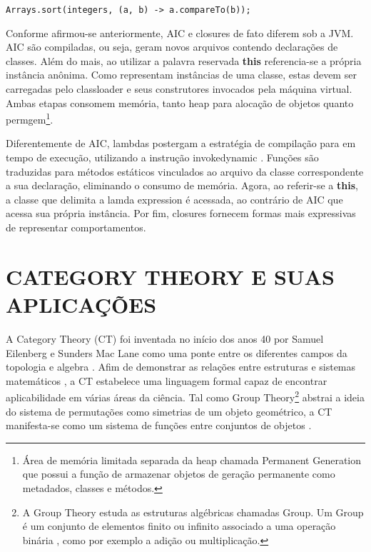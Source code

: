 \documentclass[10pt, conference]{IEEEtran}
\begin{document}
\begin{lstlisting}[caption={Sort - Lambda Expressions}, label={lst:array-lambda-sort}]
Arrays.sort(integers, (a, b) -> a.compareTo(b));
\end{lstlisting}

Conforme afirmou-se anteriormente, AIC e closures de fato diferem sob a JVM. AIC são compiladas, ou seja, geram novos arquivos contendo declarações de classes. Além do mais, ao utilizar a palavra reservada \textbf{this} referencia-se a própria instância anônima. Como representam instâncias de uma classe, estas devem ser carregadas pelo classloader e seus construtores invocados pela máquina virtual. Ambas etapas consomem memória, tanto heap \cite{hunt2011java} para alocação de objetos quanto permgem\footnote{Área de memória limitada separada da heap chamada Permanent Generation que possui a função de armazenar objetos de geração permanente como metadados, classes e métodos.}.

Diferentemente de AIC, lambdas postergam a estratégia de compilação para em tempo de execução, utilizando a instrução invokedynamic \cite{goetz2012translation}. Funções são traduzidas para métodos estáticos vinculados ao arquivo da classe correspondente a sua declaração, eliminando o consumo de memória. Agora, ao referir-se a \textbf{this}, a classe que delimita a lamda expression é acessada, ao contrário de AIC que acessa sua própria instância. Por fim, closures fornecem formas mais expressivas de representar comportamentos.

\section{CATEGORY THEORY E SUAS APLICAÇÕES}
A Category Theory (CT) foi inventada no início dos anos 40 por Samuel Eilenberg e Sunders Mac Lane \cite{eilenbergmaclane1945naturalequivalences} como uma ponte entre os diferentes campos da topologia e algebra \cite{spivak2014cts}. Afim de demonstrar as relações entre estruturas e sistemas matemáticos \cite{maclane1971mat}, a CT estabelece uma linguagem formal capaz de encontrar aplicabilidade em várias áreas da ciência. Tal como Group Theory\footnote{A Group Theory estuda as estruturas algébricas chamadas Group. Um Group é um conjunto de elementos finito ou infinito associado a uma operação binária \cite{spivak2014cts}, como por exemplo a adição ou multiplicação.} abstrai a ideia do sistema de permutações como simetrias de um objeto geométrico, a CT manifesta-se como um sistema de funções entre conjuntos de objetos \cite{awodey2010category}.
\end{document}
